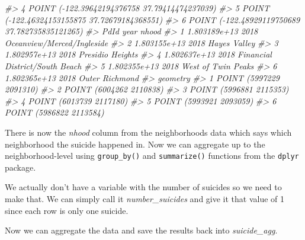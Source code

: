 \documentclass[
]{krantz}
\makeatletter
\newenvironment{Shaded}{\begin{snugshade}}{\end{snugshade}}
\newcommand{\CommentTok}[1]{\textcolor[rgb]{0.37,0.37,0.37}{\textit{#1}}}
\newcommand{\DecValTok}[1]{\textcolor[rgb]{0.06,0.06,0.06}{#1}}
\newcommand{\NormalTok}[1]{#1}
\newcommand{\OtherTok}[1]{\textcolor[rgb]{0.37,0.37,0.37}{#1}}
\newcommand{\SpecialCharTok}[1]{\textcolor[rgb]{0,0,0}{#1}}
\newenvironment{kframe}{%
\medskip{}
\setlength{\fboxsep}{.8em}
 \def\at@end@of@kframe{}%
 \ifinner\ifhmode%
  \def\at@end@of@kframe{\end{minipage}}%
  \begin{minipage}{\columnwidth}%
 \fi\fi%
 \def\FrameCommand##1{\hskip\@totalleftmargin \hskip-\fboxsep
 \colorbox{shadecolor}{##1}\hskip-\fboxsep
     \hskip-\linewidth \hskip-\@totalleftmargin \hskip\columnwidth}%
 \MakeFramed {\advance\hsize-\width
   \@totalleftmargin\z@ \linewidth\hsize
   \@setminipage}}%
 {\par\unskip\endMakeFramed%
 \at@end@of@kframe}
\renewenvironment{Shaded}{\begin{kframe}}{\end{kframe}}
\makeatother
\begin{document}
\begin{Shaded}
\begin{Highlighting}[]
\CommentTok{\#\textgreater{} 4  POINT ({-}122.39642194376758 37.79414474237039)}
\CommentTok{\#\textgreater{} 5  POINT ({-}122.46324153155875 37.72679184368551)}
\CommentTok{\#\textgreater{} 6 POINT ({-}122.48929119750689 37.782735835121265)}
\CommentTok{\#\textgreater{}           PdId year                          nhood}
\CommentTok{\#\textgreater{} 1 1.803189e+13 2018     Oceanview/Merced/Ingleside}
\CommentTok{\#\textgreater{} 2 1.803155e+13 2018                   Hayes Valley}
\CommentTok{\#\textgreater{} 3 1.802957e+13 2018               Presidio Heights}
\CommentTok{\#\textgreater{} 4 1.802637e+13 2018 Financial District/South Beach}
\CommentTok{\#\textgreater{} 5 1.802355e+13 2018             West of Twin Peaks}
\CommentTok{\#\textgreater{} 6 1.802365e+13 2018                 Outer Richmond}
\CommentTok{\#\textgreater{}                  geometry}
\CommentTok{\#\textgreater{} 1 POINT (5997229 2091310)}
\CommentTok{\#\textgreater{} 2 POINT (6004262 2110838)}
\CommentTok{\#\textgreater{} 3 POINT (5996881 2115353)}
\CommentTok{\#\textgreater{} 4 POINT (6013739 2117180)}
\CommentTok{\#\textgreater{} 5 POINT (5993921 2093059)}
\CommentTok{\#\textgreater{} 6 POINT (5986822 2113584)}
\end{Highlighting}
\end{Shaded}

There is now the \emph{nhood} column from the neighborhoods data which says which neighborhood the suicide happened in. Now we can aggregate up to the neighborhood-level using \texttt{group\_by()} and \texttt{summarize()} functions from the \texttt{dplyr} package.

We actually don't have a variable with the number of suicides so we need to make that. We can simply call it \emph{number\_suicides} and give it that value of 1 since each row is only one suicide.

\begin{Shaded}
\end{Shaded}

Now we can aggregate the data and save the results back into \emph{suicide\_agg}.
\end{document}
